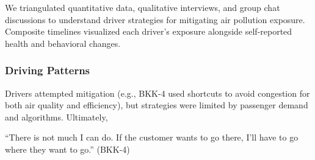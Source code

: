 

We triangulated quantitative data, qualitative interviews, and group chat discussions to understand driver strategies for mitigating air pollution exposure.
Composite timelines  visualized each driver's exposure alongside self-reported health and behavioral changes.

\subsubsection{Driving Patterns}

Drivers attempted mitigation (e.g., BKK-4 used shortcuts to avoid congestion for both air quality and efficiency), but strategies were limited by passenger demand and algorithms.
Ultimately,

\begin{quoteb}
    ``There is not much I can do. If the customer wants to go there, I'll have to go where they want to go.'' (BKK-4)
\end{quoteb}


